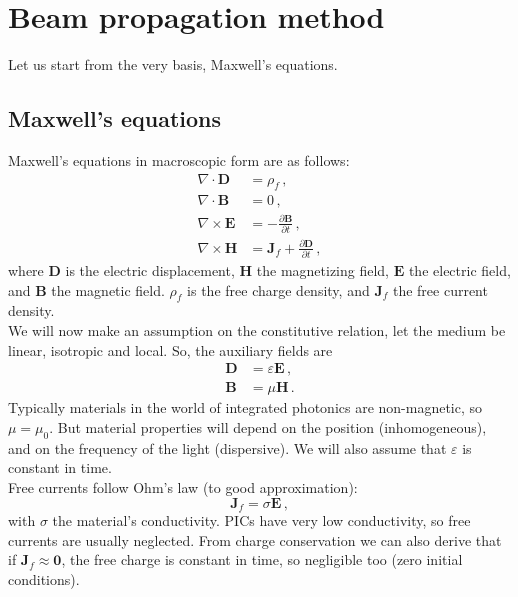 \documentclass[]{article}
\begin{document}
	\section{Beam propagation method}
	Let us start from the very basis, Maxwell's equations.
	\subsection{Maxwell's equations}
	Maxwell's equations in macroscopic form are as follows:
	\begin{subequations}
		\begin{align}
			\nabla \cdot \textbf{D} &= \rho_f \, , \\
			\nabla \cdot \textbf{B} &= 0 \, ,\\
			\nabla \times \textbf{E} &= -\frac{\partial \textbf{B}}{\partial t}\, ,\\
			\nabla \times \textbf{H} &= \textbf{J}_f + \frac{\partial \textbf{D}}{\partial t} \, ,
		\end{align}
		\label{Maxwell}
	\end{subequations}
	where $\textbf{D}$ is the electric displacement, $\textbf{H}$ the magnetizing field, $\textbf{E}$ the electric field, and $\textbf{B}$ the magnetic field. $\rho_f$ is the free charge density, and $\textbf{J}_f$ the free current density.\\
	
	We will now make an assumption on the constitutive relation, let the medium be linear, isotropic and local. So, the auxiliary fields are
	\begin{subequations}
		\begin{align}
			\textbf{D} &= \varepsilon \textbf{E}\, ,\\
			\textbf{B} &= \mu \textbf{H} \, .
		\end{align}
	\end{subequations}
	Typically materials in the world of integrated photonics are non-magnetic, so $\mu = \mu_0$. But material properties will depend on the position (inhomogeneous), and on the frequency of the light (dispersive). We will also assume that $\varepsilon$ is constant in time.\\
	
	Free currents follow Ohm's law (to good approximation):
	\begin{equation}
		\textbf{J}_f = \sigma \textbf{E} \, ,
	\end{equation}
	with $\sigma$ the material's conductivity. PICs have very low conductivity, so free currents are usually neglected. From charge conservation we can also derive that if $\textbf{J}_f \approx \textbf{0}$, the free charge is constant in time, so negligible too (zero initial conditions).\\
	
\end{document}

